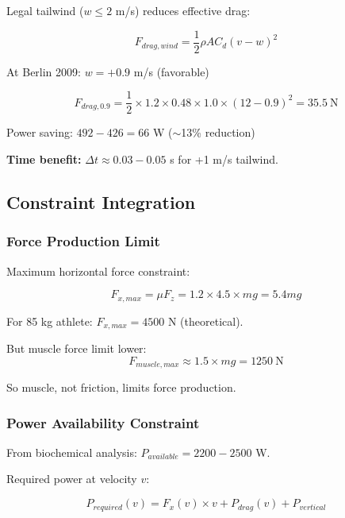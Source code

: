 Legal tailwind ($w \leq 2$ m/s) reduces effective drag:

\begin{equation}
F_{drag,wind} = \frac{1}{2} \rho A C_d (v - w)^2
\label{eq:drag_with_wind}
\end{equation}

At Berlin 2009: $w = +0.9$ m/s (favorable)

\begin{equation}
F_{drag,0.9} = \frac{1}{2} \times 1.2 \times 0.48 \times 1.0 \times (12-0.9)^2 = 35.5~\text{N}
\label{eq:drag_berlin}
\end{equation}

Power saving: $492 - 426 = 66$ W ($\sim$13\% reduction)

\textbf{Time benefit:} $\Delta t \approx 0.03-0.05$ s for +1 m/s tailwind.

\subsection{Constraint Integration}

\subsubsection{Force Production Limit}

Maximum horizontal force constraint:

\begin{equation}
F_{x,max} = \mu F_z = 1.2 \times 4.5 \times mg = 5.4 mg
\label{eq:friction_limit}
\end{equation}

For 85 kg athlete: $F_{x,max} = 4500$ N (theoretical).

But muscle force limit lower:
\begin{equation}
F_{muscle,max} \approx 1.5 \times mg = 1250~\text{N}
\label{eq:muscle_force_limit}
\end{equation}

So muscle, not friction, limits force production.

\subsubsection{Power Availability Constraint}

From biochemical analysis: $P_{available} = 2200-2500$ W.

Required power at velocity $v$:

\begin{equation}
P_{required}(v) = F_x(v) \times v + P_{drag}(v) + P_{vertical}
\label{eq:power_required_total}
\end{equation}

